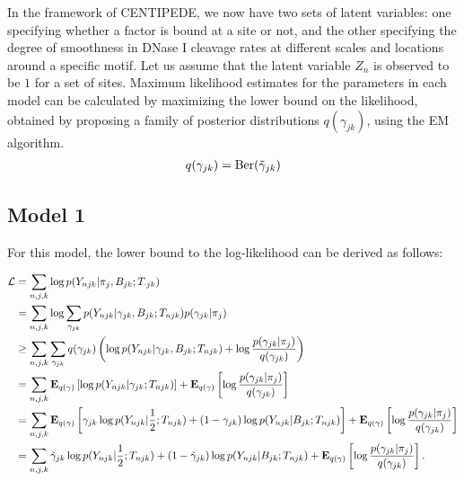 \documentclass[reqno]{amsart}
\numberwithin{equation}{section}
\begin{document}
In the framework of CENTIPEDE, we now have two sets of latent variables: one specifying whether a factor
is bound at a site or not, and the other specifying the degree of smoothness in DNase I cleavage rates
at different scales and locations around a specific motif. 
Let us assume that the latent variable $Z_n$ is observed to be $1$ for a set of sites. 
Maximum likelihood estimates for the parameters in each model can be calculated by 
maximizing the lower bound on the likelihood, obtained
by proposing a family of posterior distributions $q(\gamma_{jk})$, using the EM algorithm.
\begin{align}
    q(\gamma_{jk}) = \bernoulli(\gammav_{jk})
\end{align}

\subsection{Model 1}

For this model, the lower bound to the log-likelihood can be derived as follows:

\begin{align}
    \likelihood
        &= \sum_{n,j,k} \log p(Y_{njk} | \pi_j, B_{jk}; T_{\cdot jk}) \\
        &= \sum_{n,j,k} \log \sum_{\gamma_{jk}} p(Y_{njk} | \gamma_{jk}, B_{jk}; T_{njk}) p(\gamma_{jk} | \pi_j) \\
        &\geq \sum_{n,j,k} \sum_{\gamma_{jk}} q(\gamma_{jk}) \left( \log p(Y_{njk} | \gamma_{jk}, B_{jk}; T_{njk})
        + \log \frac{p(\gamma_{jk} | \pi_j)}{q(\gamma_{jk})} \right) \\
        &= \sum_{n,j,k} \expect{\log p(Y_{njk} | \gamma_{jk}; T_{njk})}{q(\gamma)}
        + \expect{\log \frac{p(\gamma_{jk} | \pi_j)}{q(\gamma_{jk})}}{q(\gamma)} \\
        &= \sum_{n,j,k} \expect{\gamma_{jk} \log p(Y_{njk} | \half; T_{njk}) + (1-\gamma_{jk}) \log p(Y_{njk} | B_{jk}; T_{njk})}{q(\gamma)}
        + \expect{\log \frac{p(\gamma_{jk} | \pi_j)}{q(\gamma_{jk})}}{q(\gamma)} \\
        &= \sum_{n,j,k} \gammav_{jk} \log p(Y_{njk} | \half; T_{njk}) + (1-\gammav_{jk}) \log p(Y_{njk} | B_{jk}; T_{njk})
        + \expect{\log \frac{p(\gamma_{jk} | \pi_j)}{q(\gamma_{jk})}}{q(\gamma)}.
\end{align}
\end{document}
